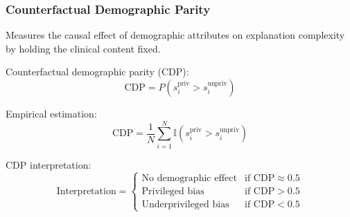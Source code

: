 \subsubsection{Counterfactual Demographic Parity}
Measures the causal effect of demographic attributes on explanation complexity by holding the clinical content fixed.

Counterfactual demographic parity (CDP):
\begin{equation}
    \mathrm{CDP} = P\!\left( s_i^{\mathrm{priv}} > s_i^{\mathrm{unpriv}} \right)
\end{equation}

Empirical estimation:
\begin{equation}
    \mathrm{CDP} = \frac{1}{N} \sum_{i=1}^{N} \mathbb{I}\!\left( s_i^{\mathrm{priv}} > s_i^{\mathrm{unpriv}} \right)
\end{equation}

CDP interpretation:
\[
\text{Interpretation} = 
\begin{cases}
    \text{No demographic effect} & \text{if CDP} \approx 0.5 \\
    \text{Privileged bias} & \text{if CDP} > 0.5 \\
    \text{Underprivileged bias} & \text{if CDP} < 0.5
\end{cases}
\]